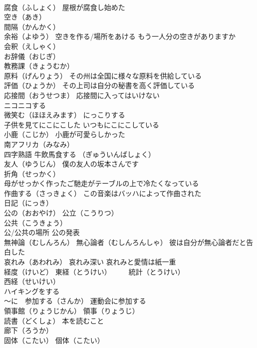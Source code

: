 \documentclass[8pt]{extreport}
\begin{document}
\begin{CJK}{UTF8}{min}
\\	腐食（ふしょく） 屋根が腐食し始めた
\\	空き（あき）
\\	間隔（かんかく）
\\	余裕（よゆう） 空きを作る/場所をあける もう一人分の空きがありますか
\\	会釈（えしゃく）　
\\	お辞儀（おじぎ） 
\\	教務課（きょうむか）
\\	原料（げんりょう） その州は全国に様々な原料を供給している
\\	評価（ひょうか） その上司は自分の秘書を高く評価している
\\	応接間（おうせつま） 応接間に入ってはいけない
\\	ニコニコする 
\\	微笑む（ほほえみます） にっこりする 
\\	子供を見てにこにこした いつもにこにこしている
\\	小鹿（こじか） 小鹿が可愛らしかった
\\	南アフリカ（みなみ）
\\	四字熟語	牛飲馬食する （ぎゅういんばしょく）
\\	友人（ゆうじん） 僕の友人の坂本さんです
\\	折角（せっかく） 
\\	母がせっかく作ったご馳走がテーブルの上で冷たくなっている
\\	作曲する（さっきょく） この音楽はバッハによって作曲された
\\	日記（にっき）
\\	公の（おおやけ） 公立（こうりつ）
\\	公共（こうきょう）
\\	公/公共の場所 公の発表
\\	無神論（むしんろん） 無心論者（むしんろんしゃ） 彼は自分が無心論者だと告白した
\\	哀れみ（あわれみ） 哀れみ深い 哀れみと愛情は紙一重
\\	経度（けいど） 東経（とうけい）　　　統計（とうけい）
\\	西経（せいけい）
\\	ハイキングをする
\\	～に　参加する（さんか） 運動会に参加する
\\	領事館（りょうじかん） 領事（りょうじ）
\\	読書（どくしょ） 本を読むこと
\\	廊下（ろうか）
\\	固体（こたい） 個体（こたい）

\end{CJK}
\end{document}
